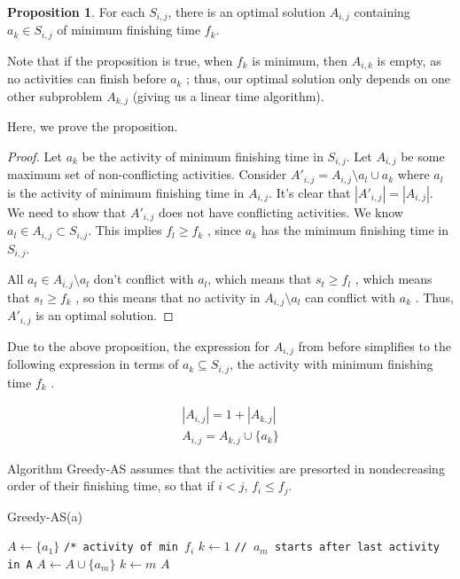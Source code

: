 \documentclass [12pt]{article}
\theoremstyle{definition}
\newtheorem{proposition}{Proposition}
\begin{document}
\begin{proposition}
For each $S_{i ,j}$, there is an optimal solution $A_{i ,j}$ containing $a_k \in S_{i ,j}$ of minimum finishing time $f_k$.
\end{proposition}
 

Note that if the proposition is true, when $f_k$ is minimum, then $A_{i ,k}$ is empty, as no activities can finish before $a_k$ ; thus, our optimal solution only depends on one other subproblem $A_{k ,j}$ (giving us a linear time algorithm). 


Here, we prove the proposition.

\begin{proof}

Let $a_k$ be the activity of minimum finishing time in $S_{i ,j}$. Let $A_{i ,j}$ be some maximum set of non-conflicting activities. Consider $A'_{i ,j} = A_{i ,j} \setminus {a_l} \cup {a_k}$ where $a_l$ is the activity of minimum finishing time in $A_{i ,j}$. It’s clear that $|A'_{i ,j}| = |A_{i ,j}|$. We need to show that $A'_{i ,j}$ does not have conflicting activities. We know $a_l \in A_{i ,j} \subset S_{i ,j}$. This implies $f_l \geq f_k$ , since $a_k$ has the minimum finishing time in $S_{i ,j}$. 

All $a_t \in A_{i ,j} \setminus {a_l}$ don’t conflict with $a_l $, which means that $s_t \geq f_l$ , which means that $s_t \geq f_k$ , so this means that no activity in $A_{i ,j} \setminus {a_l}$ can conflict with $a_k$ . Thus, $A'_{i ,j}$ is an optimal solution.
\end{proof}

Due to the above proposition, the expression for $A_{i ,j}$ from before simplifies to the following
expression in terms of $a_k \subseteq S_{i ,j}$, the activity with minimum finishing time $f_k$ .

\begin{align*}
|A_{i,j}| = 1 + |A_{k,j}| \\
A_{i,j} = A_{k,j} \cup \{a_k \}
\end{align*}

Algorithm Greedy-AS assumes that the activities are presorted in nondecreasing order of their finishing time, so that if $i < j$, $f_i \leq f_j$.

\begin{algorithm}
\caption{Greedy-AS(a)}
\label{alg:greed_as}
\begin{algorithmic}
\State $A \gets \{a_1\}$ \texttt{/* activity of min $f_i$}
\State $k \gets 1$
\State {} {
    \State {} {
        \State \texttt{// $a_m$ starts after last activity in A}
        \State $A \gets A \cup \{a_m\}$
        \State $k \gets m$
    }
}
\State \Return $A$
\end{algorithmic}
\end{algorithm}
\end{document}
